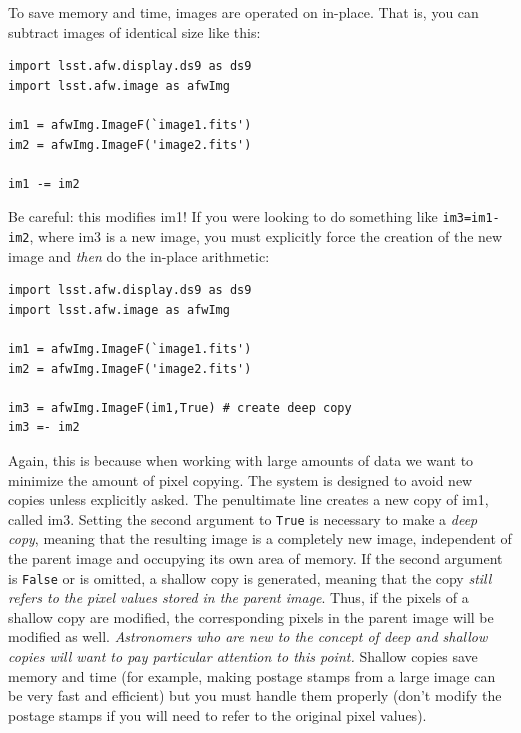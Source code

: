 To save memory and time, images are operated on in-place.  That is,
you can subtract images of identical size like this:

\begin{verbatim}
import lsst.afw.display.ds9 as ds9
import lsst.afw.image as afwImg

im1 = afwImg.ImageF(`image1.fits')
im2 = afwImg.ImageF('image2.fits')

im1 -= im2
\end{verbatim}

Be careful: this modifies im1!  If you were looking to do something
like \texttt{im3=im1-im2}, where im3 is a new image, you must
explicitly force the creation of the new image and {\it then} do the
in-place arithmetic:

\begin{verbatim}
import lsst.afw.display.ds9 as ds9
import lsst.afw.image as afwImg

im1 = afwImg.ImageF(`image1.fits')
im2 = afwImg.ImageF('image2.fits')

im3 = afwImg.ImageF(im1,True) # create deep copy
im3 =- im2
\end{verbatim}

Again, this is because when working with large amounts of data we want
to minimize the amount of pixel copying.  The system is designed to
avoid new copies unless explicitly asked.  The penultimate line
creates a new copy of im1, called im3.  Setting the second argument
to \texttt{True} is necessary to make a {\it deep copy}, meaning that
the resulting image is a completely new image, independent of the
parent image and occupying its own area of memory.  If the second
argument is \texttt{False} or is omitted, a shallow copy is generated,
meaning that the copy {\it still refers to the pixel values stored in
the parent image}.  Thus, if the pixels of a shallow copy are
modified, the corresponding pixels in the parent image will be
modified as well.  {\it Astronomers who are new to the concept of deep
and shallow copies will want to pay particular attention to this
point.}  Shallow copies save memory and time (for example, making
postage stamps from a large image can be very fast and efficient) but
you must handle them properly (don't modify the postage stamps if you
will need to refer to the original pixel values).

